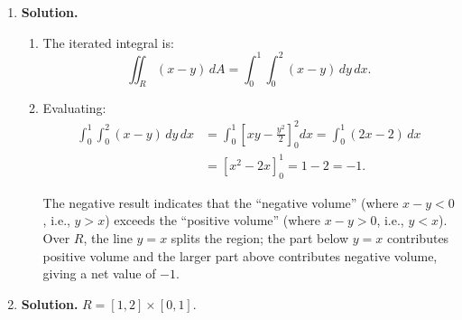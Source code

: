 \begin{enumerate}
The subrectangles and their midpoints:
\begin{itemize}
\item $R_{11}=[0,1]\times[1,2]$: midpoint $(0.5, 1.5)$
\item $R_{12}=[0,1]\times[2,3]$: midpoint $(0.5, 2.5)$
\item $R_{21}=[1,2]\times[1,2]$: midpoint $(1.5, 1.5)$
\item $R_{22}=[1,2]\times[2,3]$: midpoint $(1.5, 2.5)$
\end{itemize}

With $f(x,y)=2xy$:
\begin{align*}
S_{2,2} &= f(0.5,1.5)\cdot 1 + f(0.5,2.5)\cdot 1 + f(1.5,1.5)\cdot 1 + f(1.5,2.5)\cdot 1 \\
&= 2(0.5)(1.5) + 2(0.5)(2.5) + 2(1.5)(1.5) + 2(1.5)(2.5) \\
&= 1.5 + 2.5 + 4.5 + 7.5 = \boxed{16}.
\end{align*}

(Note: the exact value of the integral is $\int_0^2\int_1^3 2xy\,dy\,dx = \int_0^2 x[y^2]_1^3\,dx = \int_0^2 8x\,dx = 16$, so the midpoint rule gives the exact answer here, as expected for a product of linear functions.)

\item \textbf{Solution.}

\begin{enumerate}
\item The iterated integral is:
\[
\iint_R (x-y)\,dA = \int_0^1\int_0^2 (x-y)\,dy\,dx.
\]

\item Evaluating:
\begin{align*}
\int_0^1\int_0^2 (x-y)\,dy\,dx &= \int_0^1\left[xy - \frac{y^2}{2}\right]_0^2 dx
= \int_0^1 (2x - 2)\,dx \\
&= \left[x^2 - 2x\right]_0^1 = 1 - 2 = \boxed{-1}.
\end{align*}

The negative result indicates that the ``negative volume'' (where $x - y < 0$, i.e., $y > x$) exceeds the ``positive volume'' (where $x - y > 0$, i.e., $y < x$). Over $R$, the line $y = x$ splits the region; the part below $y=x$ contributes positive volume and the larger part above contributes negative volume, giving a net value of $-1$.
\end{enumerate}

\item \textbf{Solution.}
$R = [1,2]\times[0,1]$.


\end{enumerate}
